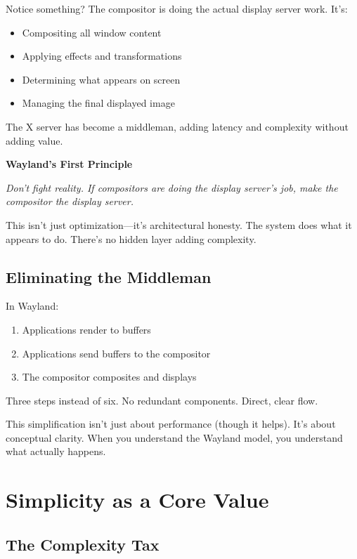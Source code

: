 Notice something? The compositor is doing the actual display server work. It's:
\begin{itemize}
    \item Compositing all window content
    \item Applying effects and transformations
    \item Determining what appears on screen
    \item Managing the final displayed image
\end{itemize}

The X server has become a middleman, adding latency and complexity without adding value.

\begin{designbox}
\textbf{Wayland's First Principle}

\textit{Don't fight reality. If compositors are doing the display server's job, make the compositor the display server.}

This isn't just optimization—it's architectural honesty. The system does what it appears to do. There's no hidden layer adding complexity.
\end{designbox}

\subsection{Eliminating the Middleman}

In Wayland:
\begin{enumerate}
    \item Applications render to buffers
    \item Applications send buffers to the compositor
    \item The compositor composites and displays
\end{enumerate}

Three steps instead of six. No redundant components. Direct, clear flow.

This simplification isn't just about performance (though it helps). It's about conceptual clarity. When you understand the Wayland model, you understand what actually happens.

\section{Simplicity as a Core Value}

\subsection{The Complexity Tax}

